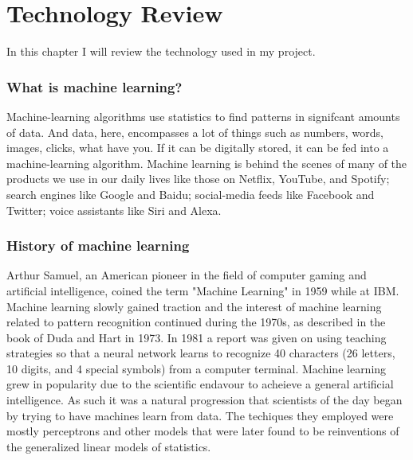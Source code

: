 \chapter{Technology Review}
In this chapter I will review the technology used in my project.

\subsection{What is machine learning?}
Machine-learning algorithms use statistics to find patterns in signifcant amounts of data. And data, here, encompasses a lot of things such as numbers, words, images, clicks, what have you. If it can be digitally stored, it can be fed into a machine-learning algorithm. Machine learning is behind the scenes of many of the products we use in our daily lives like those on Netflix, YouTube, and Spotify; search engines like Google and Baidu; social-media feeds like Facebook and Twitter; voice assistants like Siri and Alexa. 


\subsection{History of machine learning}
Arthur Samuel, an American pioneer in the field of computer gaming and artificial intelligence, coined the term "Machine Learning" in 1959 while at IBM. Machine learning slowly gained traction and the interest of machine learning related to pattern recognition continued during the 1970s, as described in the book of Duda and Hart in 1973.  In 1981 a report was given on using teaching strategies so that a neural network learns to recognize 40 characters (26 letters, 10 digits, and 4 special symbols) from a computer terminal. Machine learning grew in popularity due to the scientific endavour to acheieve a general artificial intelligence. As such it was a natural progression that scientists of the day began by trying to have machines learn from data. The techiques they employed were mostly perceptrons and other models that were later found to be reinventions of the generalized linear models of statistics. 

